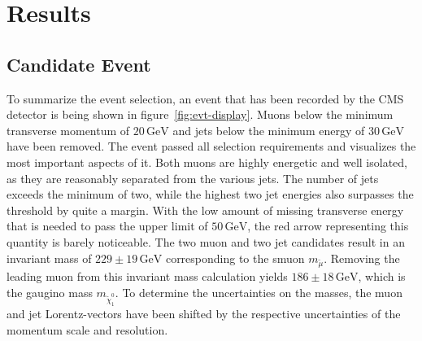\chapter{Results}
\label{cha:results}

\section{Candidate Event}
\label{sec:candidate-event}

To summarize the event selection, an event that has been recorded by the CMS detector is being shown in figure~\ref{fig:evt-display}. Muons below the minimum transverse momentum of $20\,\text{GeV}$ and jets below the minimum energy of $30\,\text{GeV}$ have been removed. The event passed all selection requirements and visualizes the most important aspects of it. Both muons are highly energetic and well isolated, as they are reasonably separated from the various jets. The number of jets exceeds the minimum of two, while the highest two jet energies also surpasses the threshold by quite a margin. With the low amount of missing transverse energy that is needed to pass the upper limit of $50\,\text{GeV}$, the red arrow representing this quantity is barely noticeable. The two muon and two jet candidates result in an invariant mass of $229 \pm 19\,\text{GeV}$ corresponding to the smuon $m_{\tilde{\mu}}$. Removing the leading muon from this invariant mass calculation yields $186 \pm 18\,\text{GeV}$, which is the gaugino mass $m_{\tilde{\chi}^0_1}$. To determine the uncertainties on the masses, the muon and jet Lorentz-vectors have been shifted by the respective uncertainties of the momentum scale and resolution.

